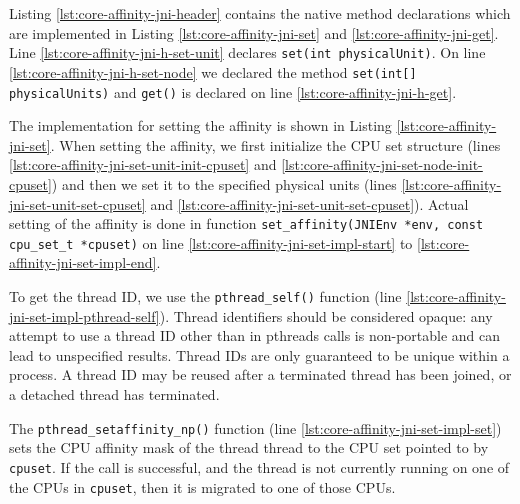

Listing \ref{lst:core-affinity-jni-header} contains the native method
declarations which are implemented in Listing
\ref{lst:core-affinity-jni-set} and
\ref{lst:core-affinity-jni-get}. Line
\ref{lst:core-affinity-jni-h-set-unit} declares
\lstinline!set(int physicalUnit)!. On line
\ref{lst:core-affinity-jni-h-set-node} we declared the method
\lstinline!set(int[] physicalUnits)! and \lstinline!get()! is declared
on line \ref{lst:core-affinity-jni-h-get}.



\newpage



\newpage

The implementation for setting the affinity is shown in Listing
\ref{lst:core-affinity-jni-set}. When setting the affinity, we first
initialize the CPU set structure (lines
\ref{lst:core-affinity-jni-set-unit-init-cpuset} and
\ref{lst:core-affinity-jni-set-node-init-cpuset}) and then we set it
to the specified physical units (lines
\ref{lst:core-affinity-jni-set-unit-set-cpuset} and
\ref{lst:core-affinity-jni-set-unit-set-cpuset}). Actual setting of
the affinity is done in function
\lstinline!set_affinity(JNIEnv *env, const cpu_set_t *cpuset)! on line
\ref{lst:core-affinity-jni-set-impl-start} to
\ref{lst:core-affinity-jni-set-impl-end}.

To get the thread ID, we use the \lstinline!pthread_self()! function
(line \ref{lst:core-affinity-jni-set-impl-pthread-self}). Thread
identifiers should be considered opaque: any attempt to use a thread
ID other than in pthreads calls is non-portable and can lead to
unspecified results. Thread IDs are only guaranteed to be unique
within a process. A thread ID may be reused after a terminated thread
has been joined, or a detached thread has terminated.

The \lstinline!pthread_setaffinity_np()! function (line
\ref{lst:core-affinity-jni-set-impl-set}) sets the CPU affinity mask
of the thread thread to the CPU set pointed to by \lstinline!cpuset!.
If the call is successful, and the thread is not currently running on
one of the CPUs in \lstinline!cpuset!, then it is migrated to one of
those CPUs.

